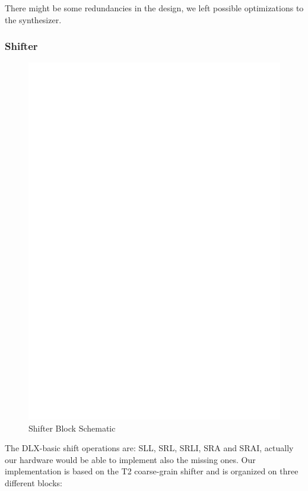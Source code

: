 \documentclass[12pt]{article}
\begin{document}
There might be some redundancies in the design, we left possible optimizations to the synthesizer.

\subsubsection{Shifter}
\begin{figure}[t]
	\includegraphics[width=\textwidth, center]{images/SHIFTER.eps}
	\caption{Shifter Block Schematic}
	\label{SHIFTER}
\end{figure}
The DLX-basic shift operations are: SLL, SRL, SRLI, SRA and SRAI, actually our hardware would be able to implement also the missing ones.
Our implementation is based on the T2 coarse-grain shifter and is organized on three different blocks:
\end{document}
